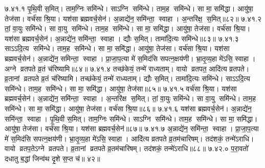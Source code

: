 ७.४१.१
पृ॒थि॒वी स॒मित्। ताम॒ग्निः समि॑न्धे। साऽग्नि समि॑न्धे। ताम॒ह समि॑न्धे। सा मा॒ समि॑द्धा। आयु॑षा॒ तेज॑सा। वर्च॑सा श्रि॒या। यश॑सा ब्रह्मवर्च॒सेन॑। अ॒न्नाद्ये॑न॒ समि॑न्ता॒ स्वाहा। अ॒न्तरि॑क्ष॒ स॒मित्॥८२॥
७.४१.२
तां॒ वा॒युः समि॑न्धे। सा वा॒यु समि॑न्धे। ताम॒ह समि॑न्धे। सा मा॒ समि॑द्धा। आयु॑षा॒ तेज॑सा। वर्च॑सा श्रि॒या। यश॑सा ब्रह्मवर्च॒सेन॑। अ॒न्नाद्ये॑न॒ समि॑न्ता॒ स्वाहा। द्यौः स॒मित्। तामा॑दि॒त्यः समि॑न्धे॥८३॥
७.४१.३
साऽऽदि॒त्य समि॑न्धे। ताम॒ह समि॑न्धे। सा मा॒ समि॑द्धा। आयु॑षा॒ तेज॑सा। वर्च॑सा श्रि॒या। यश॑सा ब्रह्मवर्च॒सेन॑। अ॒न्नाद्ये॑न॒ समिन्ता॒ स्वाहा। प्रा॒जा॒प॒त्या मे॑ स॒मिद॑सि सपत्न॒क्षय॑णी। भ्रा॒तृ॒व्य॒हा मे॑ऽसि॒ स्वाहा। अग्ने व्रतपते व्र॒तं च॑रिष्यामि॥८४॥
७.४१.४
तच्छ॑केयं॒ तन्मे॑ राध्यताम्। वायो व्रतपत॒ आदि॑त्य व्रतपते। व्र॒तानां व्रतपते व्र॒तं च॑रिष्यामि। तच्छ॑केयं॒ तन्मे॑ राध्यताम्। द्यौः स॒मित्। तामा॑दि॒त्यः समि॑न्धे। साऽऽदि॒त्य समि॑न्धे। ताम॒ह समि॑न्धे। सा मा॒ समि॑द्धा। आयु॑षा॒ तेज॑सा॥८५॥
७.४१.५
वर्च॑सा श्रि॒या। यश॑सा ब्रह्मवर्च॒सेन॑। अ॒न्नाद्ये॑न॒ समि॑न्ता॒ स्वाहा। अ॒न्तरि॑क्ष स॒मित्। तां॒ वा॒युः समि॑न्धे। सा वा॒यु समि॑न्धे। ताम॒ह समि॑न्धे। सा मा॒ समि॑द्धा। आयु॑षा॒ तेज॑सा। वर्च॑सा श्रि॒या॥८६॥
७.४१.६
यश॑सा ब्रह्मवर्च॒सेन॑। अ॒न्नाद्ये॑न॒ समि॑न्ता॒ स्वाहा। पृ॒थि॒वी स॒मित्। ताम॒ग्निः समि॑न्धे। साऽग्नि समि॑न्धे। ताम॒ह समि॑न्धे। सा मा॒ समि॑द्धा। आयु॑षा॒ तेज॑सा। वर्च॑सा श्रि॒या। यश॑सा ब्रह्मवर्च॒सेन॑॥८७॥
७.४१.७
अ॒न्नाद्ये॑न॒ समि॑न्ता॒ स्वाहा। प्रा॒जा॒प॒त्या मे॑ स॒मिद॑सि सपत्न॒क्षय॑णी। भ्रा॒तृ॒व्य॒हा मे॑ऽसि॒ स्वाहा। आदि॑त्य व्रतपते व्र॒तम॑चारिषम्। तद॑शकं॒ तन्मे॑ऽराधि। वायो व्रतप॒तेऽग्ने व्रतपते। व्र॒तानां व्रतपते व्र॒तम॑चारिषम्। तद॑शकं॒ तन्मे॑ऽराधि॥८८॥
७.४२.०
प॒रा॒वतो॑ दधातु ब॒द्धां जिन्व॑थ दृ॒शे स॒प्त च॑॥ ४२॥
\anuvakamend

